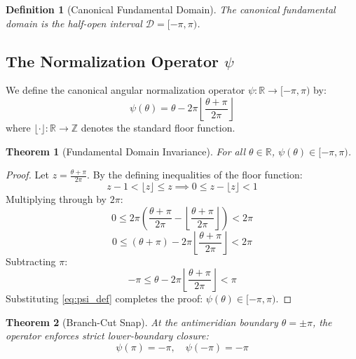 \documentclass[10pt,journal,compsoc]{IEEEtran}
\newtheorem{theorem}{Theorem}
\newtheorem{definition}{Definition}
\begin{document}
\begin{definition}[Canonical Fundamental Domain]
The canonical fundamental domain is the half-open interval $\mathcal{D} = [-\pi, \pi)$.
\end{definition}

\subsection{The Normalization Operator $\psi$}
We define the canonical angular normalization operator $\psi: \mathbb{R} \to [-\pi, \pi)$ by:
\begin{equation}
\psi(\theta) = \theta - 2\pi \left\lfloor \frac{\theta + \pi}{2\pi} \right\rfloor
\label{eq:psi_def}
\end{equation}
where $\lfloor \cdot \rfloor: \mathbb{R} \to \mathbb{Z}$ denotes the standard floor function.

\begin{theorem}[Fundamental Domain Invariance]
For all $\theta \in \mathbb{R}$, $\psi(\theta) \in [-\pi, \pi)$.
\end{theorem}

\begin{proof}
Let $z = \frac{\theta + \pi}{2\pi}$. By the defining inequalities of the floor function:
\begin{equation}
z - 1 < \lfloor z \rfloor \le z \implies 0 \le z - \lfloor z \rfloor < 1
\end{equation}
Multiplying through by $2\pi$:
\begin{equation}
0 \le 2\pi \left( \frac{\theta + \pi}{2\pi} - \left\lfloor \frac{\theta + \pi}{2\pi} \right\rfloor \right) < 2\pi
\end{equation}
\begin{equation}
0 \le (\theta + \pi) - 2\pi \left\lfloor \frac{\theta + \pi}{2\pi} \right\rfloor < 2\pi
\end{equation}
Subtracting $\pi$:
\begin{equation}
-\pi \le \theta - 2\pi \left\lfloor \frac{\theta + \pi}{2\pi} \right\rfloor < \pi
\end{equation}
Substituting \eqref{eq:psi_def} completes the proof: $\psi(\theta) \in [-\pi, \pi)$.
\end{proof}

\begin{theorem}[Branch-Cut Snap]
At the antimeridian boundary $\theta = \pm \pi$, the operator enforces strict lower-boundary closure:
\begin{equation}
\psi(\pi) = -\pi, \quad \psi(-\pi) = -\pi
\end{equation}
\end{theorem}
\end{document}
